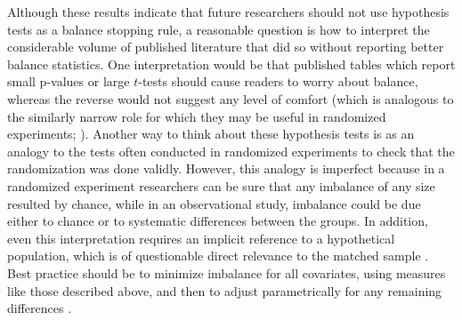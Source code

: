 \documentclass[11pt,titlepage]{article}
\begin{document}
Although these results indicate that future researchers should not use
hypothesis tests as a balance stopping rule, a reasonable question is
how to interpret the considerable volume of published literature that
did so without reporting better balance statistics.  One
interpretation would be that published tables which report small
p-values or large $t$-tests should cause readers to worry about
balance, whereas the reverse would not suggest any level of comfort
(which is analogous to the similarly narrow role for which they may be
useful in randomized experiments; \citealt{Senn94}).  Another way to
think about these hypothesis tests is as an analogy to the tests often
conducted in randomized experiments to check that the randomization
was done validly.  However, this analogy is imperfect because in a
randomized experiment researchers can be sure that any imbalance of
any size resulted by chance, while in an observational study,
imbalance could be due either to chance or to systematic differences
between the groups.  In addition, even this interpretation requires an
implicit reference to a hypothetical population, which is of
questionable direct relevance to the matched sample \citep{Cochran65}.
Best practice should be to minimize imbalance for all covariates,
using measures like those described above, and then to adjust
parametrically for any remaining differences
\citep{Rubin79,RosRub84a,HoImaKin06}.
\end{document}
